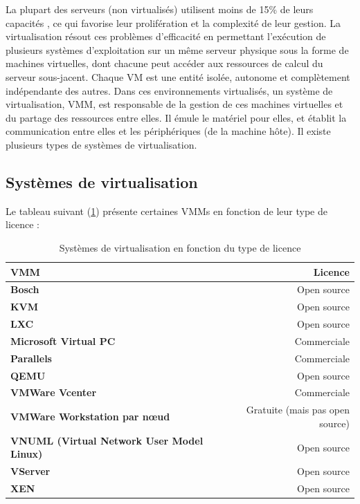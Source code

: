 \par\noindent La plupart des serveurs (non virtualisés) utilisent moins de 15\% de leurs capacités \cite{online1}, ce qui favorise leur prolifération et la complexité de leur gestion. La virtualisation résout ces problèmes d’efficacité en permettant l'exécution de plusieurs systèmes d’exploitation sur un même serveur physique sous la forme de machines virtuelles, dont chacune peut accéder aux ressources de calcul du serveur sous-jacent. Chaque VM est une entité isolée, autonome et complètement indépendante des autres. Dans ces environnements virtualisés, un système de virtualisation, \ac{VMM}, est responsable de la gestion de ces machines virtuelles et du partage des ressources entre elles. Il émule le matériel pour elles, et établit la communication entre elles et les périphériques (de la machine hôte). Il existe plusieurs types de systèmes de virtualisation.

\subsection{Systèmes de virtualisation}
Le tableau suivant (\ref{tab:sytemes_virtualisation}) présente certaines \acs{VMM}s en fonction de leur type de licence :
\begin{table}[H]
  \begin{center}
    \caption{Systèmes de virtualisation en fonction du type de licence}
    \begin{tabular}{>{\bfseries}l r}
      \hline
      \textbf{VMM} & \textbf{Licence} \\
      \hline
      Bosch & Open source \\ 
      KVM & Open source \\ 
      LXC & Open source \\ 
      Microsoft Virtual PC & Commerciale \\ 
      Parallels & Commerciale \\
      QEMU & Open source \\ 
      VMWare Vcenter & Commerciale \\ 
      VMWare Workstation par nœud & Gratuite (mais pas open source) \\ 
      VNUML (Virtual Network User Model Linux) & Open source \\
      VServer & Open source \\ 
      XEN & Open source \\ \hline
    \end{tabular}
    \label{tab:sytemes_virtualisation}
  \end{center}
\end{table}

